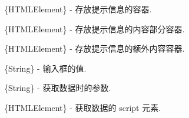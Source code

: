 \documentclass[letterpaper,10pt,english]{sphinxmanual}
\begin{document}

\begin{fulllineitems}
\label{api/component/suggest/index:Suggest.container}
\{HTMLElement\} - 存放提示信息的容器.

\end{fulllineitems}



\begin{fulllineitems}
\label{api/component/suggest/index:Suggest.content}
\{HTMLElement\} - 存放提示信息的内容部分容器.

\end{fulllineitems}



\begin{fulllineitems}
\label{api/component/suggest/index:Suggest.footer}
\{HTMLElement\} - 存放提示信息的额外内容容器.

\end{fulllineitems}



\begin{fulllineitems}
\label{api/component/suggest/index:Suggest.query}
\{String\} - 输入框的值.

\end{fulllineitems}



\begin{fulllineitems}
\label{api/component/suggest/index:Suggest.queryParams}
\{String\} - 获取数据时的参数.

\end{fulllineitems}



\begin{fulllineitems}
\label{api/component/suggest/index:Suggest.dataScript}
\{HTMLElement\} - 获取数据的 script 元素.

\end{fulllineitems}
\end{document}
